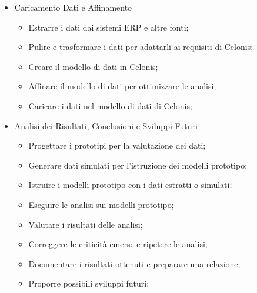 {\begin{itemize}
        \begin{itemize}
	 \item Caricamento Dati e Affinamento
	 \begin{itemize}
		\item Estrarre i dati dai sistemi ERP e altre fonti;
		\item Pulire e trasformare i dati per adattarli ai requisiti di Celonis;
		\item Creare il modello di dati in Celonis;
		\item Affinare il modello di dati per ottimizzare le analisi;
		\item Caricare i dati nel modello di dati di Celonis;
	 \end{itemize}
	 \item Analisi dei Risultati, Conclusioni e Sviluppi Futuri
	 \begin{itemize}
		\item Progettare i prototipi per la valutazione dei dati;
	 	\item Generare dati simulati per l'istruzione dei modelli prototipo;
	 	\item Istruire i modelli prototipo con i dati estratti o simulati;
	 	\item Eseguire le analisi sui modelli prototipo;
	 	\item Valutare i risultati delle analisi;
	 	\item Correggere le criticità emerse e ripetere le analisi;
	 	\item Documentare i risultati ottenuti e preparare una relazione;
	 	\item Proporre possibili sviluppi futuri;
	 \end{itemize}
        \end{itemize}
    \end{itemize}
}

\newcommand{\totaleOre}{306}

